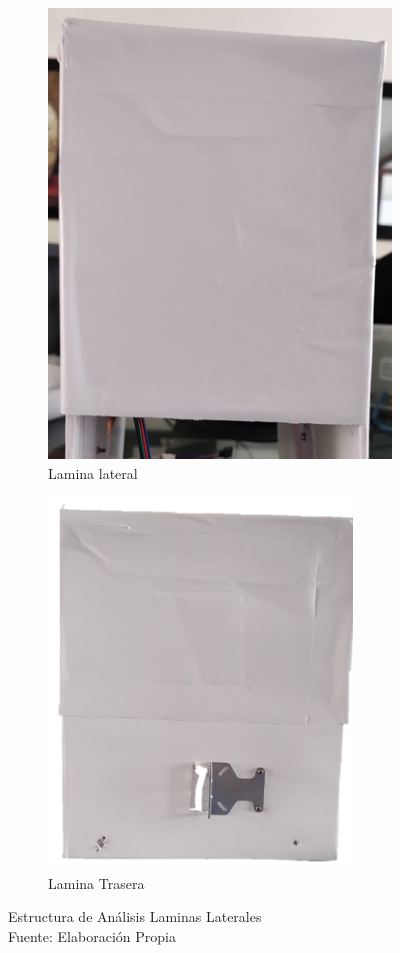 \begin{figure}[ht]
	\centering
	\begin{subfigure}{0.47\linewidth}
		\centering
		\includegraphics[scale=0.4]{Figs/302.png}
		\caption{Lamina lateral}
		\label{fig:lateral}
	\end{subfigure}
	\begin{subfigure}{0.47\linewidth}
		\centering
		\includegraphics[scale=0.5]{Figs/303.png}
		\caption{Lamina Trasera}
		\label{fig:trasera}
	\end{subfigure}
	\caption{Estructura de Análisis Laminas Laterales\\
	Fuente: Elaboración Propia}
	\label{fig:estructuras}
\end{figure}   
 
